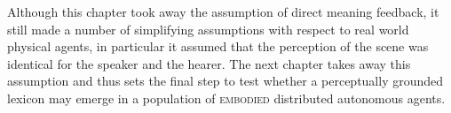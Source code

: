 Although this chapter took away the assumption of 
direct meaning feedback, it still made a number of 
simplifying assumptions with respect to real world
physical agents, in particular it assumed that 
the perception of the scene was identical for
the speaker and the hearer. The next chapter takes away 
this assumption and thus sets the final step to test 
whether a perceptually grounded lexicon may 
emerge in a population of {\scshape embodied} distributed 
autonomous agents. 

